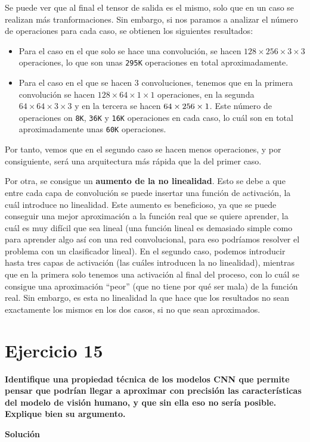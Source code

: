\documentclass[11pt,a4paper]{article}
\newcommand{\answer}{\noindent\textbf{Solución}}
\newcommand{\question}[1]{\noindent\textbf{#1}}
\newcommand{\nonumsection}[1]{\section*{#1}\addcontentsline{toc}{section}{#1}}
\begin{document}
Se puede ver que al final el tensor de salida es el mismo, solo que en un
caso se realizan más tranformaciones. Sin embargo, si nos
paramos a analizar el número de operaciones para cada caso, se obtienen
los siguientes resultados:

\begin{itemize}
  \item Para el caso en el que solo se hace una convolución, se hacen
  $128 \times 256 \times 3 \times 3$ operaciones, lo que son unas
  \texttt{295K} operaciones en total aproximadamente.
  \item Para el caso en el que se hacen 3 convoluciones, tenemos que
  en la primera convolución se hacen $128 \times 64 \times 1 \times 1$ operaciones,
  en la segunda $64 \times 64 \times 3 \times 3$ y en la tercera se hacen
  $64 \times 256 \times 1 \time 1$. Este número de operaciones on
  \texttt{8K}, \texttt{36K} y \texttt{16K} operaciones en cada caso,
  lo cuál son en total aproximadamente unas \texttt{60K} operaciones.
\end{itemize}


Por tanto, vemos que en el segundo caso se hacen menos operaciones, y por
consiguiente, será una arquitectura más rápida que la del primer caso.

Por otra, se consigue un \textbf{aumento de la no linealidad}. Esto se debe
a que entre cada capa de convolución se puede insertar una función de activación,
la cuál introduce no linealidad. Este aumento es beneficioso, ya que
se puede conseguir una mejor aproximación a la función real que se quiere aprender,
la cuál es muy difícil que sea lineal (una función lineal es demasiado simple
como para aprender algo así con una red convolucional, para eso podríamos
resolver el problema con un clasificador lineal). En el segundo caso, podemos
introducir hasta tres capas de activación (las cuáles introducen la no linealidad),
mientras que en la primera solo tenemos una activación al final del proceso,
con lo cuál se consigue una aproximación ``peor'' (que no tiene por qué ser mala)
de la función real. Sin embargo, es esta no linealidad la que hace que los
resultados no sean exactamente los mismos en los dos casos, si no que sean aproximados.

 
\nonumsection{Ejercicio 15}

\question{Identifique una propiedad técnica de los modelos CNN que permite
pensar que podrían llegar a aproximar con precisión las
características del modelo de visión humano, y que sin ella eso no
sería posible. Explique bien su argumento.}

\answer

\newpage



\end{document}

